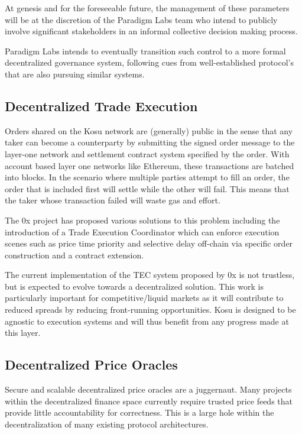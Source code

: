 \documentclass[10pt]{article}
\begin{document}
At genesis and for the foreseeable future, the management of these parameters will be at the discretion of the Paradigm Labs team who intend to publicly involve significant stakeholders in an informal collective decision making process. 
\medskip

Paradigm Labs intends to eventually transition such control to a more formal decentralized governance system, following cues from well-established protocol’s that are also pursuing similar systems.

\subsection{Decentralized Trade Execution}\label{future-work-tec}
Orders shared on the Kosu network are (generally) public in the sense that any taker can become a counterparty by submitting the signed order message to the layer-one network and settlement contract system specified by the order. With account based layer one networks like Ethereum, these transactions are batched into blocks. In the scenario where multiple parties attempt to fill an order, the order that is included first will settle while the other will fail. This means that the taker whose transaction failed will waste gas and effort.
\medskip

The 0x project has proposed various solutions to this problem including the introduction of a Trade Execution Coordinator which can enforce execution scenes such as price time priority and selective delay off-chain via specific order construction and a contract extension\cite{0x-selective-delay}.
\medskip

The current implementation of the TEC system proposed by 0x is not trustless, but is expected to evolve towards a decentralized solution\cite{0x-coordinator-specification}. This work is particularly important for competitive/liquid markets as it will contribute to reduced spreads by reducing front-running opportunities. Kosu is designed to be agnostic to execution systems and will thus benefit from any progress made at this layer.

\subsection{Decentralized Price Oracles}\label{future-work-oracles}
Secure and scalable decentralized price oracles are a juggernaut. Many projects within the decentralized finance space currently require trusted price feeds that provide little accountability for correctness. This is a large hole within the decentralization of many existing protocol architectures.
\medskip
\end{document}
